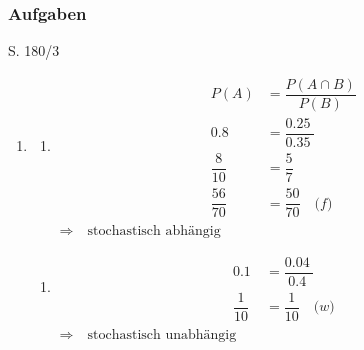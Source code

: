 
\subsubsection{Aufgaben}

\begin{Exercise}{S. 180/3}{}
\begin{enumerate}[leftmargin=*]
    \item [3.]{
        \begin{minipage}[t]{0.45\linewidth}
        \begin{enumerate}[label=\alph*),leftmargin=*]
            \item[a)] {
            \begin{align*}
                P(A) &= \dfrac{P\left(A \cap B\right)}{P(B)} \\[1.5ex]
                \SI{0.8}{} &= \dfrac{\SI{0.25}{}}{\SI{0.35}{}} \\[1.5ex]
                \dfrac{8}{10} &= \dfrac{5}{7} \\[1.5ex]
                \dfrac{56}{70} &= \dfrac{50}{70}\quad \textit{(f)}
            \end{align*}
            $\Rightarrow \quad \text{stochastisch abhängig}$
            }
        \end{enumerate}
        \end{minipage}
        \hfill
        \begin{minipage}[t]{0.45\linewidth}
        \begin{enumerate}[label=\alph*),leftmargin=*]
            \item[b)] {
            \begin{align*}
                \SI{0.1}{} &= \dfrac{\SI{0.04}{}}{\SI{0.4}{}} \\[1.5ex]
                \dfrac{1}{10} &= \dfrac{1}{10} \quad \textit{(w)}
            \end{align*}
            $\Rightarrow \quad \text{stochastisch unabhängig}$
            }
        \end{enumerate}
        \end{minipage}
        }
\end{enumerate}
\end{Exercise}

